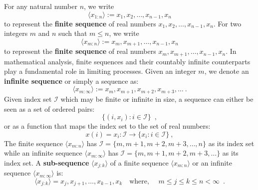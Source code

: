 For any natural number $n$, we write
$$\boxed{\langle x_{1:n} \rangle := x_1,x_{2},\ldots,x_{n-1},x_n}$$
to represent the {\bf finite sequence} of real numbers $x_1,x_2,\ldots ,x_{n-1},x_n$.
For two integers $m$ and $n$ such that $m \leq n$, we write
$$\boxed{\langle x_{m:n} \rangle := x_m,x_{m+1},\ldots,x_{n-1},x_n}$$
to represent the {\bf finite sequence} of real numbers $x_m,x_{m+1},\ldots ,x_{n-1},x_n$.  In mathematical analysis, finite sequences and their countably infinite counterparts play a fundamental role in limiting processes.  Given an integer $m$, we denote an {\bf infinite sequence} or simply a sequence as:
\[
\boxed{
\langle x_{m:\infty} \rangle := x_m, x_{m+1}, x_{m+2}, x_{m+3}, \ldots \ . }
\]
Given index set $\mathcal{I}$ which may be finite or infinite in size, a sequence can either be seen as a set of ordered pairs:
\[
\{ (i,x_i) : i \in \mathcal{I} \} \enspace ,
\]
or as a function that maps the index set to the set of real numbers:
\[
x(i)= x_i : \mathcal{I} \to \{x_{i} : i \in \mathcal{I} \} \ ,
\]
The finite sequence $\langle x_{m:n} \rangle$ has $\mathcal{I}= \{ m,m+1,m+2,m+3,\ldots,n \}$ as its index set  while an infinite sequence $\langle x_{m:\infty} \rangle$ has $\mathcal{I}= \{ m,m+1,m+2,m+3,\ldots \}$ as its index set.  A {\bf sub-sequence} $\langle x_{j:k} \rangle$ of a finite sequence $\langle x_{m:n} \rangle$ or an infinite sequence $\langle x_{m:\infty} \rangle$ is:
\[
\langle x_{j:k} \rangle = x_j,x_{j+1},\ldots,x_{k-1},x_{k} \quad \text{where, } \quad m \leq j \leq k \leq n < \infty \enspace .
\]

